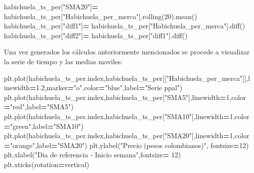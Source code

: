 \documentclass[
]{book}
\newenvironment{Shaded}{\begin{snugshade}}{\end{snugshade}}
\newcommand{\DecValTok}[1]{\textcolor[rgb]{0.00,0.00,0.81}{#1}}
\newcommand{\FloatTok}[1]{\textcolor[rgb]{0.00,0.00,0.81}{#1}}
\newcommand{\NormalTok}[1]{#1}
\newcommand{\OperatorTok}[1]{\textcolor[rgb]{0.81,0.36,0.00}{\textbf{#1}}}
\newcommand{\StringTok}[1]{\textcolor[rgb]{0.31,0.60,0.02}{#1}}
\begin{document}
\begin{Shaded}
\begin{Highlighting}[]
\NormalTok{habichuela\_ts\_per[}\StringTok{"SMA20"}\NormalTok{]}\OperatorTok{=}\NormalTok{ habichuela\_ts\_per[}\StringTok{"Habichuela\_per\_merca"}\NormalTok{].rolling(}\DecValTok{20}\NormalTok{).mean()}
\NormalTok{habichuela\_ts\_per[}\StringTok{"diff1"}\NormalTok{]}\OperatorTok{=}\NormalTok{ habichuela\_ts\_per[}\StringTok{"Habichuela\_per\_merca"}\NormalTok{].diff()}
\NormalTok{habichuela\_ts\_per[}\StringTok{"diff2"}\NormalTok{]}\OperatorTok{=}\NormalTok{ habichuela\_ts\_per[}\StringTok{"diff1"}\NormalTok{].diff()}
\end{Highlighting}
\end{Shaded}

Una vez generados los cálculos anteriormente mencionados se procede a visualizar la serie de tiempo y las medias moviles:

\begin{Shaded}
\begin{Highlighting}[]

\NormalTok{plt.plot(habichuela\_ts\_per.index,habichuela\_ts\_per[[}\StringTok{"Habichuela\_per\_merca"}\NormalTok{]],linewidth}\OperatorTok{=}\FloatTok{1.2}\NormalTok{,marker}\OperatorTok{=}\StringTok{"o"}\NormalTok{,color}\OperatorTok{=}\StringTok{"blue"}\NormalTok{,label}\OperatorTok{=}\StringTok{"Serie ppal"}\NormalTok{)}
\NormalTok{plt.plot(habichuela\_ts\_per.index,habichuela\_ts\_per[}\StringTok{"SMA5"}\NormalTok{],linewidth}\OperatorTok{=}\DecValTok{1}\NormalTok{,color}\OperatorTok{=}\StringTok{"red"}\NormalTok{,label}\OperatorTok{=}\StringTok{"SMA5"}\NormalTok{)}
\NormalTok{plt.plot(habichuela\_ts\_per.index,habichuela\_ts\_per[}\StringTok{"SMA10"}\NormalTok{],linewidth}\OperatorTok{=}\DecValTok{1}\NormalTok{,color}\OperatorTok{=}\StringTok{"green"}\NormalTok{,label}\OperatorTok{=}\StringTok{"SMA10"}\NormalTok{)}
\NormalTok{plt.plot(habichuela\_ts\_per.index,habichuela\_ts\_per[}\StringTok{"SMA20"}\NormalTok{],linewidth}\OperatorTok{=}\DecValTok{1}\NormalTok{,color}\OperatorTok{=}\StringTok{"orange"}\NormalTok{,label}\OperatorTok{=}\StringTok{"SMA20"}\NormalTok{)}
\NormalTok{plt.ylabel(}\StringTok{"Precio (pesos colombianos)"}\NormalTok{, fontsize}\OperatorTok{=}\DecValTok{12}\NormalTok{)}
\NormalTok{plt.xlabel(}\StringTok{"Dia de referencia {-} Inicio semana"}\NormalTok{,fontsize}\OperatorTok{=} \DecValTok{12}\NormalTok{)}
\NormalTok{plt.xticks(rotation}\OperatorTok{=}\StringTok{\textquotesingle{}vertical\textquotesingle{}}\NormalTok{)}
\end{Highlighting}
\end{Shaded}
\end{document}
